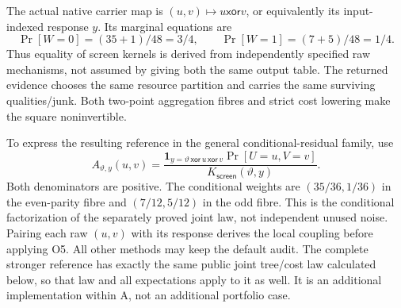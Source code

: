 The actual native carrier map is $(u,v)\mapsto u\mathbin{\mathsf{xor}}v$,
or equivalently its input-indexed response $y$. Its marginal equations are
\[
\Pr[W=0]=(35+1)/48=3/4,\qquad
\Pr[W=1]=(7+5)/48=1/4.
\]
Thus equality of screen kernels is derived from independently specified
raw mechanisms, not assumed by giving both the same output table.
The returned evidence chooses the same resource partition and carries
the same surviving qualities/junk. Both two-point aggregation fibres
and strict cost lowering make the square noninvertible.

To express the resulting reference in the general conditional-residual
family, use
\[
A_{\vartheta,y}(u,v)=
\frac{\mathbf1_{y=\vartheta\,\mathsf{xor}\,u\,\mathsf{xor}\,v}
      \Pr[U=u,V=v]}{K_{\mathsf{screen}}(\vartheta,y)}.
\]
Both denominators are positive. The conditional weights are
$(35/36,1/36)$ in the even-parity fibre and $(7/12,5/12)$ in the odd
fibre. This is the conditional factorization of the separately proved
joint law, not independent unused noise. Pairing each raw $(u,v)$ with
its response derives the local coupling before applying O5.
All other methods may keep the default audit. The complete stronger
reference has exactly the same public joint tree/cost law calculated
below, so that law and all expectations apply to it as well. It is an
additional implementation within A, not an additional portfolio case.

